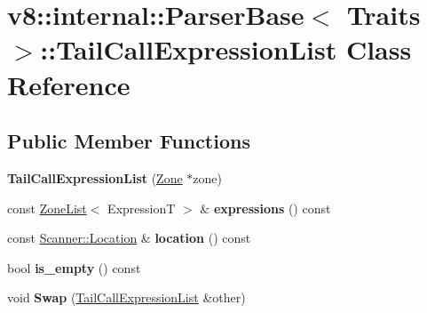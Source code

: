 \hypertarget{classv8_1_1internal_1_1_parser_base_1_1_tail_call_expression_list}{}\section{v8\+:\+:internal\+:\+:Parser\+Base$<$ Traits $>$\+:\+:Tail\+Call\+Expression\+List Class Reference}
\label{classv8_1_1internal_1_1_parser_base_1_1_tail_call_expression_list}
\subsection*{Public Member Functions}
\begin{DoxyCompactItemize}
\item 
{\bfseries Tail\+Call\+Expression\+List} (\hyperlink{classv8_1_1internal_1_1_zone}{Zone} $\ast$zone)\hypertarget{classv8_1_1internal_1_1_parser_base_1_1_tail_call_expression_list_abf4b6bb5a3852b1c4a1cc4e60a4c64f7}{}\label{classv8_1_1internal_1_1_parser_base_1_1_tail_call_expression_list_abf4b6bb5a3852b1c4a1cc4e60a4c64f7}

\item 
const \hyperlink{classv8_1_1internal_1_1_zone_list}{Zone\+List}$<$ ExpressionT $>$ \& {\bfseries expressions} () const \hypertarget{classv8_1_1internal_1_1_parser_base_1_1_tail_call_expression_list_a94a9b35136c9dcdd38c7c9747487f783}{}\label{classv8_1_1internal_1_1_parser_base_1_1_tail_call_expression_list_a94a9b35136c9dcdd38c7c9747487f783}

\item 
const \hyperlink{structv8_1_1internal_1_1_scanner_1_1_location}{Scanner\+::\+Location} \& {\bfseries location} () const \hypertarget{classv8_1_1internal_1_1_parser_base_1_1_tail_call_expression_list_ae489bff08a8095a70fc4f1f390a4366e}{}\label{classv8_1_1internal_1_1_parser_base_1_1_tail_call_expression_list_ae489bff08a8095a70fc4f1f390a4366e}

\item 
bool {\bfseries is\+\_\+empty} () const \hypertarget{classv8_1_1internal_1_1_parser_base_1_1_tail_call_expression_list_a6667156ce5d2106581f3ab2384f4a37d}{}\label{classv8_1_1internal_1_1_parser_base_1_1_tail_call_expression_list_a6667156ce5d2106581f3ab2384f4a37d}

\item 
void {\bfseries Swap} (\hyperlink{classv8_1_1internal_1_1_parser_base_1_1_tail_call_expression_list}{Tail\+Call\+Expression\+List} \&other)\hypertarget{classv8_1_1internal_1_1_parser_base_1_1_tail_call_expression_list_ac6bb2381e8b5594bdaee1258258e8f9a}{}\label{classv8_1_1internal_1_1_parser_base_1_1_tail_call_expression_list_ac6bb2381e8b5594bdaee1258258e8f9a}


\end{DoxyCompactItemize}
